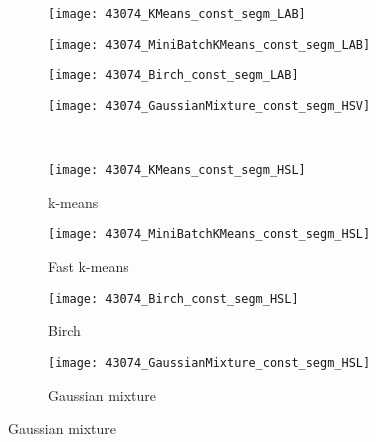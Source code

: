 \begin{figure}[!ht]
    
    \begin{subfigure}[b]{\textwidth+20pt\relax}
    	\centering
    	\texttt{[image: 43074\_KMeans\_const\_segm\_LAB]} 
    \end{subfigure}      
    \begin{subfigure}[b]{0.23\textwidth}
    	\centering
        \texttt{[image: 43074\_MiniBatchKMeans\_const\_segm\_LAB]}
    \end{subfigure}
    \begin{subfigure}[b]{0.23\textwidth}
    	\centering
        \texttt{[image: 43074\_Birch\_const\_segm\_LAB]}
    \end{subfigure}
    \begin{subfigure}[b]{0.23\textwidth}
    	\centering
        \texttt{[image: 43074\_GaussianMixture\_const\_segm\_HSV]}
    \end{subfigure} \\ \vspace{-5pt}
    
    
    \begin{subfigure}[b]{\textwidth+20pt\relax}
    	\centering
    	\texttt{[image: 43074\_KMeans\_const\_segm\_HSL]} 
    	\caption{k-means}
    \end{subfigure}      
    \begin{subfigure}[b]{0.23\textwidth}
    	\centering
        \texttt{[image: 43074\_MiniBatchKMeans\_const\_segm\_HSL]}
        \caption{Fast k-means}
    \end{subfigure}
    \begin{subfigure}[b]{0.23\textwidth}
    	\centering
        \texttt{[image: 43074\_Birch\_const\_segm\_HSL]}
        \caption{Birch}
    \end{subfigure}
    \begin{subfigure}[b]{0.23\textwidth}
    	\centering
        \texttt{[image: 43074\_GaussianMixture\_const\_segm\_HSL]}
        \caption{Gaussian mixture}
    \end{subfigure} 
    

\end{figure}
